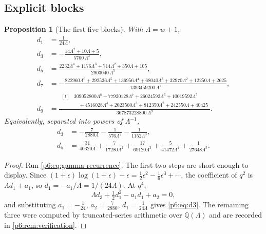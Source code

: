 \documentclass[11pt,a4paper,oneside]{book}
\theoremstyle{plain}
\newtheorem{proposition}[theorem]{Proposition}
\theoremstyle{definition}
\theoremstyle{remark}
\newcommand{\Rat}{\mathbb{Q}}
\begin{document}
\subsection{Explicit blocks}

\begin{proposition}[The first five blocks]\label{p6:prop:gamma-blocks}
With $\Lambda=w+1$,
\begin{align}
 d_1&=\frac1{24\Lambda},\label{p6:eq:d1}\\
 d_3&=-\frac{14\Lambda^{2}+10\Lambda+5}{5760\,\Lambda^{3}},\label{p6:eq:d3}\\
 d_5&=\frac{2232\Lambda^{4}+1176\Lambda^{3}+714\Lambda^{2}
 +350\Lambda+105}{2903040\,\Lambda^{5}},\label{p6:eq:d5}\\
 d_7&=-\frac{822960\Lambda^{6}+292536\Lambda^{5}+136956\Lambda^{4}
 +68040\Lambda^{3}+32970\Lambda^{2}+12250\Lambda+2625}
 {1393459200\,\Lambda^{7}},\label{p6:eq:d7}\\
 d_9&=\frac{\begin{aligned}[t]
 &309052800\Lambda^{8}+77920128\Lambda^{7}+26024592\Lambda^{6}
  +10019592\Lambda^{5}\\
 &\quad{}+4516028\Lambda^{4}+2023560\Lambda^{3}+812350\Lambda^{2}
  +242550\Lambda+40425\end{aligned}}
 {367873228800\,\Lambda^{9}} .\label{p6:eq:d9}
\end{align}
Equivalently, separated into powers of $\Lambda^{-1}$,
\begin{align}
 d_3&=-\frac7{2880\Lambda}-\frac1{576\Lambda^{2}}
       -\frac1{1152\Lambda^{3}},\label{p6:eq:d3-sep}\\
 d_5&=\frac{31}{40320\Lambda}+\frac7{17280\Lambda^{2}}
      +\frac{17}{69120\Lambda^{3}}+\frac5{41472\Lambda^{4}}
      +\frac1{27648\Lambda^{5}} .\label{p6:eq:d5-sep}
\end{align}
\end{proposition}

\begin{proof}
Run \eqref{p6:eq:gamma-recurrence}.  The first two steps are short enough to
display.  Since
$(1+\epsilon)\log(1+\epsilon)-\epsilon=\tfrac12\epsilon^{2}
-\tfrac16\epsilon^{3}+\cdots$, the coefficient of $q^{2}$ is
$\Lambda d_1+a_1$, so $d_1=-a_1/\Lambda=1/(24\Lambda)$.  At $q^{4}$,
\[
 \Lambda d_3+\tfrac12d_1^{2}-a_1d_1+a_2=0,
\]
and substituting $a_1=-\tfrac1{24}$, $a_2=\tfrac7{2880}$,
$d_1=\tfrac1{24\Lambda}$ gives \eqref{p6:eq:d3}.  The remaining three were
computed by truncated-series arithmetic over $\Rat(\Lambda)$ and are recorded
in \cref{p6:rem:verification}.
\end{proof}
\end{document}
